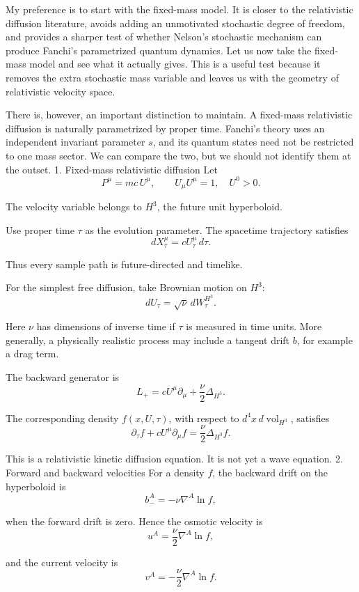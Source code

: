 My preference is to start with the fixed-mass model. It is closer to the relativistic diffusion literature, avoids adding an unmotivated stochastic degree of freedom, and provides a sharper test of whether Nelson's stochastic mechanism can produce Fanchi's parametrized quantum dynamics.
Let us now take the fixed-mass model and see what it actually gives. This is a useful test because it removes the extra stochastic mass variable and leaves us with the geometry of relativistic velocity space.

There is, however, an important distinction to maintain. A fixed-mass relativistic diffusion is naturally parametrized by proper time. Fanchi's theory uses an independent invariant parameter \(s\), and its quantum states need not be restricted to one mass sector. We can compare the two, but we should not identify them at the outset.
1. Fixed-mass relativistic diffusion
Let
\[
P^\mu=mc\,U^\mu,\qquad U_\mu U^\mu=1,\quad U^0>0.
\]

The velocity variable belongs to \(H^3\), the future unit hyperboloid.

Use proper time \(\tau\) as the evolution parameter. The spacetime trajectory satisfies
\[
dX^\mu_\tau=cU^\mu_\tau\,d\tau.
\tag{1}
\]

Thus every sample path is future-directed and timelike.

For the simplest free diffusion, take Brownian motion on \(H^3\):
\[
dU_\tau=\sqrt{\nu}\,dW^{H^3}_\tau.
\tag{2}
\]

Here \(\nu\) has dimensions of inverse time if \(\tau\) is measured in time units. More generally, a physically realistic process may include a tangent drift \(b\), for example a drag term.

The backward generator is
\[
L_+=cU^\mu\partial_\mu+\frac{\nu}{2}\Delta_{H^3}.
\tag{3}
\]

The corresponding density \(f(x,U,\tau)\), with respect to
\(d^4x\,d\operatorname{vol}_{H^3}\), satisfies
\[
\boxed{
\partial_\tau f+
cU^\mu\partial_\mu f
=\frac{\nu}{2}\Delta_{H^3}f.
}
\tag{4}
\]

This is a relativistic kinetic diffusion equation. It is not yet a wave equation.
2. Forward and backward velocities
For a density \(f\), the backward drift on the hyperboloid is
\[
b_-^A=-\nu\nabla^A\ln f,
\tag{5}
\]

when the forward drift is zero. Hence the osmotic velocity is
\[
u^A=\frac{\nu}{2}\nabla^A\ln f,
\tag{6}
\]

and the current velocity is
\[
v^A=-\frac{\nu}{2}\nabla^A\ln f.
\tag{7}
\]

